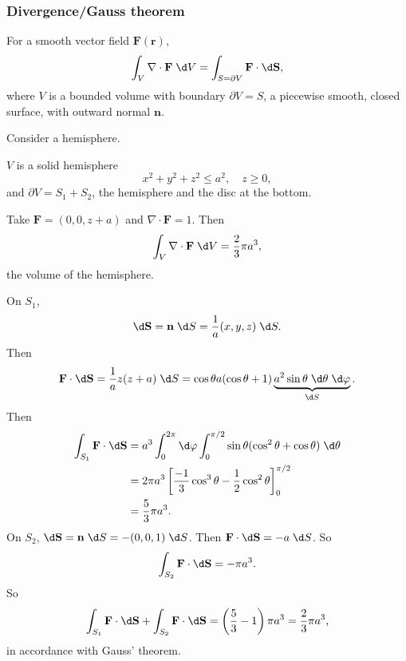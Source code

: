 \documentclass[a4paper]{article}
\begin{document}
\subsubsection{Divergence/Gauss theorem}
\begin{thm}
  For a smooth vector field $\mathbf{F}(\mathbf{r})$,
  \[
    \int _V \nabla\cdot \mathbf{F}\;\d V = \int_{S = \partial V}\mathbf{F}\cdot \d \mathbf{S},
  \]
  where $V$ is a bounded volume with boundary $\partial V = S$, a piecewise smooth, closed surface, with outward normal $\mathbf{n}$.
\end{thm}

\begin{eg}
  Consider a hemisphere.
  \begin{center}
  \end{center}

  $V$ is a solid hemisphere
  \[
    x^2 + y^2 + z^2 \leq a^2, \quad z \geq 0,
  \]
  and $\partial V = S_1 + S_2$, the hemisphere and the disc at the bottom.

  Take $\mathbf{F} = (0, 0, z + a)$ and $\nabla \cdot \mathbf{F} = 1$. Then
  \[
    \int_V\nabla \cdot \mathbf{F}\;\d V = \frac{2}{3}\pi a^3,
  \]
  the volume of the hemisphere.

  On $S_1$, 
  \[
    \d \mathbf{S} = \mathbf{n}\;\d S = \frac{1}{a}(x, y, z)\;\d S.
  \]
  Then
  \[
    \mathbf{F}\cdot \d \mathbf{S} = \frac{1}{a}z(z + a)\;\d S = \cos \theta a(\cos \theta + 1)\underbrace{a^2\sin \theta\;\d \theta\;\d \varphi}_{\d S}.
  \]
  Then 
  \begin{align*}
    \int_{S_1}\mathbf{F}\cdot \d \mathbf{S} &= a^3\int_0^{2\pi}\d \varphi \int_0^{\pi/2}\sin \theta(\cos^2\theta + \cos \theta)\;\d \theta\\
    &= 2\pi a^3 \left[\frac{-1}{3}\cos^3 \theta - \frac{1}{2}\cos^2 \theta\right]_0^{\pi/2}\\
    &= \frac{5}{3}\pi a^3.
  \end{align*}
  On $S_2$, $\d \mathbf{S} = \mathbf{n}\;\d S = -(0, 0, 1)\;\d S$. Then $\mathbf{F}\cdot \d \mathbf{S} = -a\;\d S$. So
  \[
    \int_{S_2} \mathbf{F}\cdot \d \mathbf{S} = -\pi a^3.
  \]
  So
  \[
    \int_{S_1}\mathbf{F}\cdot \d \mathbf{S} +\int_{S_2}\mathbf{F}\cdot \d \mathbf{S} = \left(\frac{5}{3} - 1\right)\pi a^3 = \frac{2}{3}\pi a^3,
  \]
  in accordance with Gauss' theorem.
\end{eg}
\end{document}
